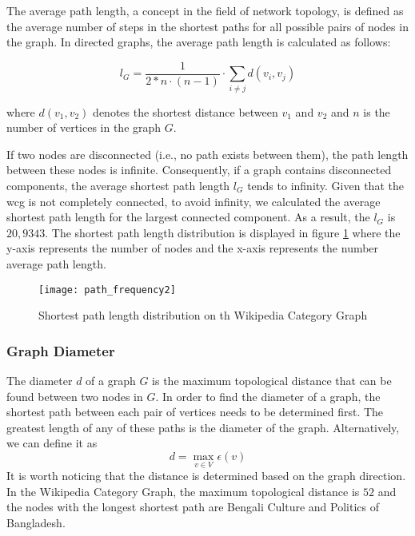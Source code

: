 The average path length, a concept in the field of network topology, is defined as the average number of steps in the shortest paths for all possible pairs of nodes in the graph. In directed graphs, the average path length is calculated as follows:

\begin{equation}
l_{G}={\frac  {1}{2 * n\cdot (n-1)}}\cdot \sum _{{i\neq j}}d(v_{i},v_{j})
\end{equation}

where $d(v_{1},v_{2})$ denotes the shortest distance between $v_1$ and $v_2$ and $n$ is the number of vertices in the graph $G$. 

If two nodes are disconnected (i.e., no path exists between them), the path length between these nodes is infinite. Consequently, if a graph contains disconnected components, the average shortest path length $l_G$ tends to infinity. 
Given that the \gls{wcg} is not completely connected, to avoid infinity, we calculated the average shortest path length for the largest connected component. As a result, the $l_G$ is $20,9343$. The shortest path length distribution is displayed in figure \ref{fig:path-distribution} where the y-axis represents the number of nodes and the x-axis represents the number average path length.



\begin{figure}[H]
  \texttt{[image: path\_frequency2]}
  \caption{Shortest path length distribution on th Wikipedia Category Graph}
  \label{fig:path-distribution}
\end{figure}


\subsubsection{\hspace*{3pt} Graph Diameter}

The diameter $d$ of a graph $G$ is the maximum topological distance that can be found between two nodes in $G$. In order to find the diameter of a graph, the shortest path between each pair of vertices needs to be determined first. The greatest length of any of these paths is the diameter of the graph. Alternatively, we can define it as 
\begin{equation}
d=\max _{v\in V}\epsilon (v)
\end{equation}
It is worth noticing that the distance is determined based on the graph direction. In the Wikipedia Category Graph, the maximum topological distance is $52$ and the nodes with the longest shortest path are Bengali Culture and Politics of Bangladesh. 


